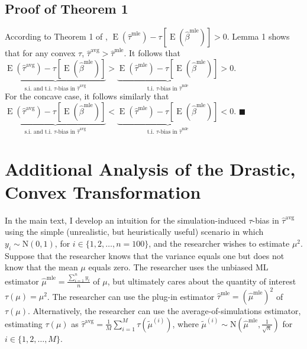 \documentclass[12pt]{article}
\newenvironment{proof}[1][Proof]{\begin{trivlist}
\item[\hskip \labelsep {\bfseries #1}]}{\end{trivlist}}
\DeclareMathOperator*{\E}{\text{E}}
\begin{document}
\subsection{Proof of Theorem 1}

\begin{proof}
According to Theorem 1 of \citet[p.\@ 405]{Rainey2017}, $\E\left( \hat{\tau}^\text{mle}\right) -  \tau \left[\E\left( \hat{\beta}^\text{mle} \right) \right] > 0$.
Lemma 1 shows that for any convex $\tau$, $\hat{\tau}^{\text{avg}} > \hat{\tau}^\text{mle}$.
It follows that $\underbrace{\E\left( \hat{\tau}^\text{avg}\right) - \tau \left[\E\left( \hat{\beta}^\text{mle} \right) \right]}_{\text{s.i. and t.i. } \tau\text{-bias in }\hat{\tau}^{\text{avg}}} > \underbrace{\E\left( \hat{\tau}^\text{mle}\right) -  \tau \left[\E\left( \hat{\beta}^\text{mle} \right) \right]}_{\text{t.i. } \tau\text{-bias in }\hat{\tau}^{\text{mle}}} > 0$.\\

\noindent For the concave case, it follows similarly that $\underbrace{\E\left( \hat{\tau}^\text{avg}\right) - \tau \left[\E\left( \hat{\beta}^\text{mle} \right) \right]}_{\text{s.i. and t.i. } \tau\text{-bias in }\hat{\tau}^{\text{avg}}} < \underbrace{\E\left( \hat{\tau}^\text{mle}\right) -  \tau \left[\E\left( \hat{\beta}^\text{mle} \right) \right]}_{\text{t.i. } \tau\text{-bias in }\hat{\tau}^{\text{mle}}} < 0$.
 $\blacksquare$
\end{proof}

\section{Additional Analysis of the Drastic, Convex Transformation}\label{appendix:drastic-analysis}

\onehalfspace

In the main text, I develop an intuition for the simulation-induced $\tau$-bias in $\hat{\tau}^\text{avg}$ using the simple (unrealistic, but heuristically useful) scenario in which $y_i \sim \text{N}(0, 1)$, for $i \in \{1, 2, \ldots, n = 100\}$, and the researcher wishes to estimate $\mu^2$. Suppose that the researcher knows that the variance equals one but does not know that the mean $\mu$ equals zero. The researcher uses the unbiased ML estimator $\hat{\mu}^\text{mle} = \frac{\sum_{i=1}^n y_i}{n}$ of $\mu$, but ultimately cares about the quantity of interest $\tau(\mu) = \mu^2$. The researcher can use the plug-in estimator $\hat{\tau}^\text{mle} = \left( \hat{\mu}^\text{mle} \right) ^2$ of $\tau(\mu)$. Alternatively, the researcher can use the average-of-simulations estimator, estimating $\tau(\mu)$ as $\hat{\tau}^\text{avg} = \frac{1}{M} \sum_{i = 1}^M \tau \left( \tilde{\mu}^{(i)} \right)$, where $\tilde{\mu}^{(i)} \sim \text{N} \left( \hat{\mu}^\text{mle}, \frac{1}{\sqrt{n}} \right)$ for $i \in \{1, 2,\ldots, M\}$.
\end{document}
